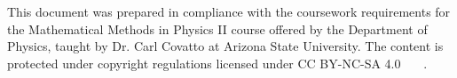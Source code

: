 \documentclass[aip,graphicx,amsmath,amssymb,reprint]{revtex4-1}
\begin{document}

%
%

%

\begin{acknowledgments}
This document was prepared in compliance with the coursework requirements for the Mathematical Methods in Physics II course offered by the Department of Physics, taught by Dr. Carl Covatto at Arizona State University. The content is protected under copyright regulations licensed under CC BY-NC-SA 4.0 \ccLogo \ \ccAttribution \ \ccNonCommercial \ \ccShareAlike.
\end{acknowledgments}


\end{document}
